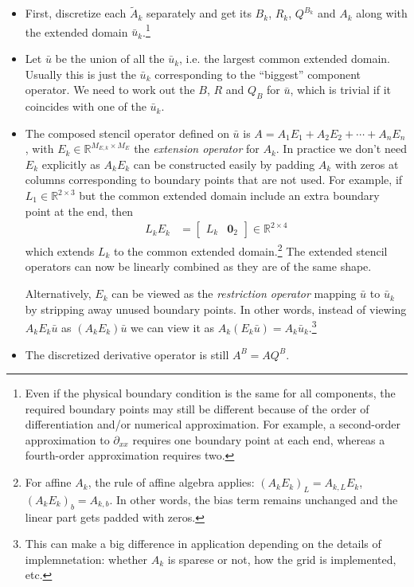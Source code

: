 \documentclass[11pt]{article}
\newcommand{\R}{\ensuremath{\mathbb{R}}}
\newcommand{\D}[1][]{\ensuremath{\partial_{#1}}}
\begin{document}
\begin{itemize}
	\item First, discretize each $\tilde{A}_k$ separately and get its $B_k$, $R_k$, $Q^{B_k}$ and $A_k$ along with the extended domain $\bar{u}_k$.\footnote{Even if the physical boundary condition is the same for all components, the required boundary points may still be different because of the order of differentiation and/or numerical approximation. For example, a second-order approximation to $\D[xx]$ requires one boundary point at each end, whereas a fourth-order approximation requires two.}

	\item Let $\bar{u}$ be the union of all the $\bar{u}_k$, i.e. the largest common extended domain. Usually this is just the $\bar{u}_k$ corresponding to the ``biggest'' component operator. We need to work out the $B$, $R$ and $Q_B$ for $\bar{u}$, which is trivial if it coincides with one of the $\bar{u}_k$.

	\item The composed stencil operator defined on $\bar{u}$ is $A = A_1E_1 + A_2E_2 + \cdots + A_nE_n$, with $E_k \in \R^{M_{E,k} \times M_E}$ the \textit{extension operator} for $A_k$. In practice we don't need $E_k$ explicitly as $A_kE_k$ can be constructed easily by padding $A_k$ with zeros at columns corresponding to boundary points that are not used. For example, if $L_1 \in \R^{2 \times 3}$ but the common extended domain include an extra boundary point at the end, then
	\begin{align*}
		L_kE_k &= \begin{bmatrix}
			L_k & \mathbf{0}_2
		\end{bmatrix} \in \R^{2 \times 4}
	\end{align*}
	which extends $L_k$ to the common extended domain.\footnote{For affine $A_k$, the rule of affine algebra applies: $(A_kE_k)_L = A_{k,L}E_k$, $(A_kE_k)_b = A_{k,b}$. In other words, the bias term remains unchanged and the linear part gets padded with zeros.} The extended stencil operators can now be linearly combined as they are of the same shape.

	Alternatively, $E_k$ can be viewed as the \textit{restriction operator} mapping $\bar{u}$ to $\bar{u}_k$ by stripping away unused boundary points. In other words, instead of viewing $A_kE_k\bar{u}$ as $(A_kE_k)\bar{u}$ we can view it as $A_k(E_k\bar{u}) = A_k\bar{u}_k$.\footnote{This can make a big difference in application depending on the details of implemnetation: whether $A_k$ is sparese or not, how the grid is implemented, etc.}

	\item The discretized derivative operator is still $A^B = AQ^B$.
\end{itemize}
\end{document}
